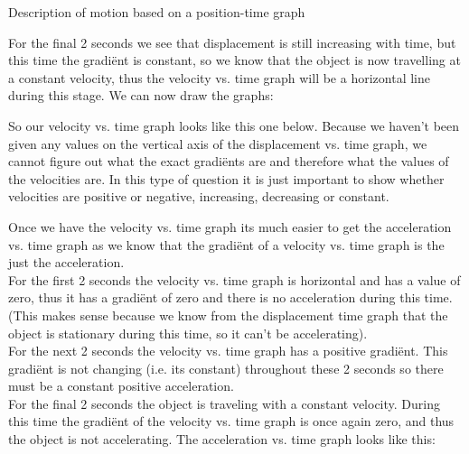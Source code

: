 \begin{wex}{Description of motion based on a position-time graph}
{
For the final 2 seconds we see that displacement is still increasing with time, but this time the gradi\"ent is constant, so we know that the object is now travelling at a constant velocity, thus the velocity vs. time graph will be a horizontal line during this stage. We can now draw the graphs:

So our velocity vs. time graph looks like this one below. Because we haven't been given any values on the vertical axis of the displacement vs. time graph, we cannot figure out what the exact gradi\"ents are and therefore what the values of the velocities are. In this type of question it is just important to show whether velocities are positive or negative, increasing, decreasing or constant.

\begin{center}
\end{center}

Once we have the velocity vs. time graph its much easier to get the acceleration vs. time graph as we know that the gradi\"ent of a velocity vs. time graph is the just the acceleration.\\

For the first 2 seconds the velocity vs. time graph is horizontal and has a value of zero, thus it has a gradi\"ent of zero and there is no acceleration during this time. (This makes sense because we know from the displacement time graph that the object is stationary during this time, so it can't be accelerating).\\

For the next 2 seconds the velocity vs. time graph has a positive gradi\"ent. This gradi\"ent is not changing (i.e. its constant) throughout these 2 seconds so there must be a constant positive acceleration.\\

For the final 2 seconds the object is traveling with a constant velocity. During this time the gradi\"ent of the velocity vs. time graph is once again zero, and thus the object is not accelerating.
The acceleration vs. time graph looks like this:

}
\end{wex}
